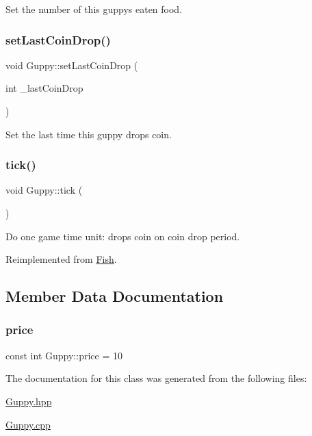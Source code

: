 Set the number of this guppy\textquotesingle{}s eaten food. 

\mbox{\label{class_guppy_a39d8082e478435982f05baa6e64b0901}} 
\subsubsection{\texorpdfstring{set\+Last\+Coin\+Drop()}{setLastCoinDrop()}}
{\footnotesize\ttfamily void Guppy\+::set\+Last\+Coin\+Drop (\begin{DoxyParamCaption}\item[{int}]{\+\_\+last\+Coin\+Drop }\end{DoxyParamCaption})}



Set the last time this guppy drops coin. 

\mbox{\label{class_guppy_ab2f219fa29b0d22ee9702a55fede519b}} 
\subsubsection{\texorpdfstring{tick()}{tick()}}
{\footnotesize\ttfamily void Guppy\+::tick (\begin{DoxyParamCaption}{ }\end{DoxyParamCaption})\hspace{0.3cm}{\ttfamily [virtual]}}



Do one game time unit\+: drops coin on coin drop period. 



Reimplemented from \mbox{\hyperlink{class_fish_aa49a70677a400c471b1e3db5d8f1881e}{Fish}}.



\subsection{Member Data Documentation}
\mbox{\label{class_guppy_ab0e5429cdfa8dfaafd56422fe35de0c7}} 
\subsubsection{\texorpdfstring{price}{price}}
{\footnotesize\ttfamily const int Guppy\+::price = 10\hspace{0.3cm}{\ttfamily [static]}}



The documentation for this class was generated from the following files\+:\begin{DoxyCompactItemize}
\item 
\mbox{\hyperlink{_guppy_8hpp}{Guppy.\+hpp}}\item 
\mbox{\hyperlink{_guppy_8cpp}{Guppy.\+cpp}}\end{DoxyCompactItemize}
